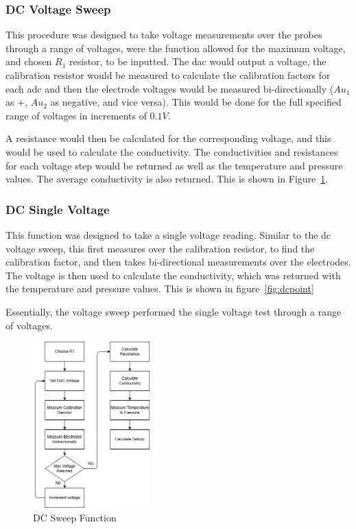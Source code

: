 \subsubsection{DC Voltage Sweep}
This procedure was designed to take voltage measurements over the probes through a range of voltages, were the function allowed for the maximum voltage, and chosen $R_1$ resistor, to be inputted.
The \gls{dac} would output a voltage, the calibration resistor would be measured to calculate the calibration factors for each \gls{adc} and then the electrode voltages would be measured bi-directionally ($Au_1$ as +, $Au_2$ as negative, and vice versa).
This would be done for the full specified range of voltages in increments of $0.1V$.

A resistance would then be calculated for the corresponding voltage, and this would be used to calculate the conductivity.
The conductivities and resistances for each voltage step would be returned as well as the temperature and pressure values.
The average conductivity is also returned. This is shown in Figure~\ref{fig:dcsweep}.

\subsubsection{DC Single Voltage}
This function was designed to take a single voltage reading.
Similar to the \gls{dc} voltage sweep, this first measures over the calibration resistor, to find the calibration factor, and then takes bi-directional measurements over the electrodes.
The voltage is then used to calculate the conductivity, which was returned with the temperature and pressure values.
This is shown in figure~\ref{fig:dcpoint}

Essentially, the voltage sweep performed the single voltage test through a range of voltages.

\begin{figure}[H]
    \centering
    \includegraphics[width=0.4\textwidth]{figures/dcsweep.png}
    \caption{DC Sweep Function}
    \label{fig:dcsweep}
\end{figure}

